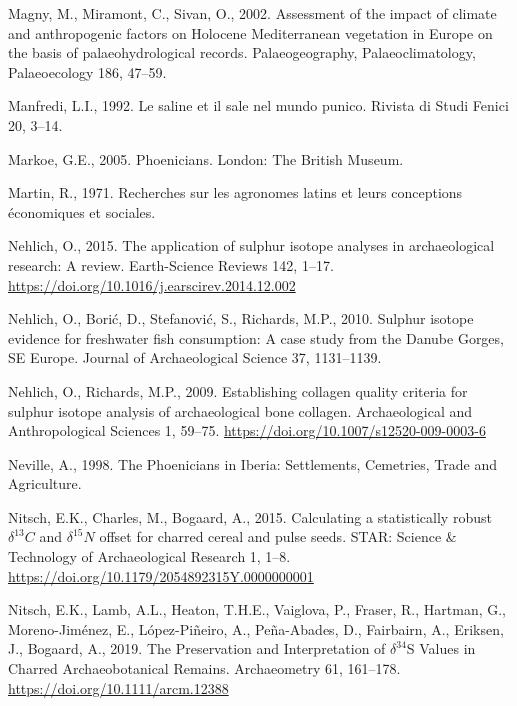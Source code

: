 \documentclass[preprint, 3p, authoryear]{elsarticle} %
\newlength{\cslhangindent}
\newlength{\cslentryspacingunit} %
\newenvironment{CSLReferences}[2] %
 {%
  \setlength{\parindent}{0pt}
  \ifodd #1
  \let\oldpar\par
  \def\par{\hangindent=\cslhangindent\oldpar}
  \fi
  \setlength{\parskip}{#2\cslentryspacingunit}
 }%
 {}
\begin{document}
\begin{CSLReferences}{1}{0}
\leavevmode{}%
Magny, M., Miramont, C., Sivan, O., 2002. Assessment of the impact of climate and anthropogenic factors on {Holocene Mediterranean} vegetation in {Europe} on the basis of palaeohydrological records. Palaeogeography, Palaeoclimatology, Palaeoecology 186, 47--59.

\leavevmode{}%
Manfredi, L.I., 1992. Le saline et il sale nel mundo punico. Rivista di Studi Fenici 20, 3--14.

\leavevmode{}%
Markoe, G.E., 2005. Phoenicians. {London}: {The British Museum}.

\leavevmode{}%
Martin, R., 1971. Recherches sur les agronomes latins et leurs conceptions économiques et sociales.

\leavevmode{}%
Nehlich, O., 2015. The application of sulphur isotope analyses in archaeological research: {A} review. Earth-Science Reviews 142, 1--17. \url{https://doi.org/10.1016/j.earscirev.2014.12.002}

\leavevmode{}%
Nehlich, O., Borić, D., Stefanović, S., Richards, M.P., 2010. Sulphur isotope evidence for freshwater fish consumption: A case study from the {Danube Gorges}, {SE Europe}. Journal of Archaeological Science 37, 1131--1139.

\leavevmode{}%
Nehlich, O., Richards, M.P., 2009. Establishing collagen quality criteria for sulphur isotope analysis of archaeological bone collagen. Archaeological and Anthropological Sciences 1, 59--75. \url{https://doi.org/10.1007/s12520-009-0003-6}

\leavevmode{}%
Neville, A., 1998. The {Phoenicians} in {Iberia}: {Settlements}, {Cemetries}, {Trade} and {Agriculture}.

\leavevmode{}%
Nitsch, E.K., Charles, M., Bogaard, A., 2015. Calculating a statistically robust \(\delta ^{13}C\) and \(\delta ^{15}N\) offset for charred cereal and pulse seeds. STAR: Science \& Technology of Archaeological Research 1, 1--8. \url{https://doi.org/10.1179/2054892315Y.0000000001}

\leavevmode{}%
Nitsch, E.K., Lamb, A.L., Heaton, T.H.E., Vaiglova, P., Fraser, R., Hartman, G., Moreno-Jiménez, E., López-Piñeiro, A., Peña-Abades, D., Fairbairn, A., Eriksen, J., Bogaard, A., 2019. The {Preservation} and {Interpretation} of {\(\delta^{34}\)S Values} in {Charred Archaeobotanical Remains}. Archaeometry 61, 161--178. \url{https://doi.org/10.1111/arcm.12388}


\end{CSLReferences}
\end{document}
